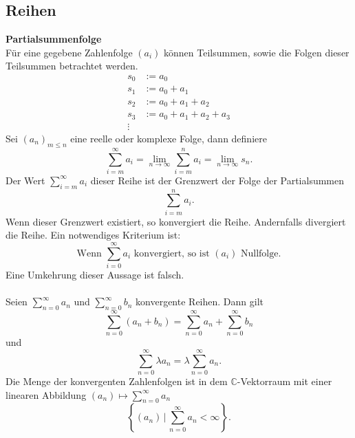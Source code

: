 \documentclass[a4paper,12pt]{article}
\begin{document}
\subsection{Reihen}
\textbf{Partialsummenfolge}\\ 
Für eine gegebene Zahlenfolge $\left(a_i\right)$ können Teilsummen, sowie die Folgen dieser Teilsummen betrachtet werden.
\begin{align*}
        s_0&:=a_0\\
        s_1&:=a_0+a_1\\
        s_2&:=a_0+a_1+a_2\\
        s_3&:=a_0+a_1+a_2+a_3\\
        \vdots&
\end{align*}
Sei $\left(a_n\right)_{m\leq n}$ eine reelle oder komplexe Folge, dann definiere
\[ 
        \sum_{i=m}^{\infty}a_i=\lim_{n\rightarrow \infty}\sum_{i=m}^{n}a_i=\lim_{n\rightarrow \infty}s_n
.\] 
Der Wert $\sum_{i=m}^{\infty}a_i$ dieser Reihe ist der Grenzwert der Folge der Partialsummen
\[ 
        \sum_{i=m}^{n}a_i
.\] 
Wenn dieser Grenzwert existiert, so konvergiert die Reihe. Andernfalls divergiert die Reihe. Ein notwendiges Kriterium ist:
\[ 
        \text{Wenn }\sum_{i=0}^{\infty}a_i\text{ konvergiert, so ist }\left(a_i\right)\text{ Nullfolge}
.\] 
Eine Umkehrung dieser Aussage ist falsch.\\\\
Seien $\sum_{n=0}^{\infty}a_n$ und $\sum_{n=0}^{\infty}b_n$ konvergente Reihen. Dann gilt
\[ 
        \sum_{n=0}^{\infty}\left(a_n+b_n\right)=\sum_{n=0}^{\infty}a_n+\sum_{n=0}^{\infty}b_n
\] 
und
\[ 
        \sum_{n=0}^{\infty}\lambda a_n=\lambda \sum_{n=0}^{\infty}a_n
.\] 
Die Menge der konvergenten Zahlenfolgen ist in dem $\mathbb{C}$-Vektorraum mit einer linearen Abbildung $\left(a_n\right)\mapsto\sum_{n=0}^{\infty}a_n$ 
\[ 
        \left\{\left(a_n\right)\,|\, \sum_{n=0}^{\infty}a_n<\infty\right\}
.\] 
\end{document}
